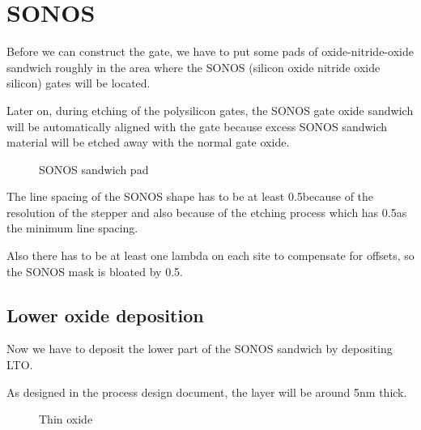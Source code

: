 \section{SONOS}\label{sonos_chapter}

Before we can construct the gate, we have to put some pads of oxide-nitride-oxide sandwich roughly in the area where the SONOS (silicon oxide nitride oxide silicon) gates will be located.

Later on, during etching of the polysilicon gates, the SONOS gate oxide sandwich will be automatically aligned with the gate because excess SONOS sandwich material will be etched away with the normal gate oxide.

\begin{figure}[H]
	\centering
	\begin{tikzpicture}[node distance = 3cm, auto, thick,scale=\CrossAndTopSectionBig, every node/.style={transform shape}]
		
	\end{tikzpicture}
	\caption{SONOS sandwich pad}
\end{figure}

The line spacing of the SONOS shape has to be at least 0.5\um because of the resolution of the stepper and also because of the etching process which has 0.5\um as the minimum line spacing.

Also there has to be at least one lambda on each site to compensate for offsets, so the SONOS mask is bloated by 0.5\um.

\newpage

\subsection{Lower oxide deposition}\label{step_depositing_sonos_lower_lto}

Now we have to deposit the lower part of the SONOS sandwich by depositing LTO.

As designed in the process design document, the layer will be around 5nm thick.

\begin{figure}[H]
	\centering
	\begin{tikzpicture}[node distance = 3cm, auto, thick,scale=\CrossSectionOnly, every node/.style={transform shape}]
		
	\end{tikzpicture}
	\begin{tikzpicture}[node distance = 3cm, auto, thick,scale=\CrossSectionOnly, every node/.style={transform shape}]
		
	\end{tikzpicture}
	\caption{Thin oxide}
\end{figure}

